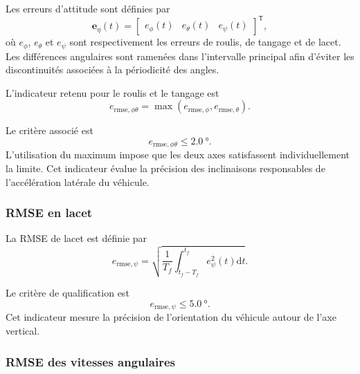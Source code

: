 \documentclass[11pt,a4paper,oneside]{report}
\newcommand{\vect}[1]{\bm{#1}}
\newcommand{\trans}{^{\mathsf T}}
\newcommand{\dd}{\mathrm{d}}
\begin{document}
Les erreurs d'attitude sont définies par
\begin{equation}
	\vect e_\eta(t)
	=
	\begin{bmatrix}
		e_\phi(t) & e_\theta(t) & e_\psi(t)
	\end{bmatrix}\trans,
	\label{eq_attitude_tracking_error}
\end{equation}
où $e_\phi$, $e_\theta$ et $e_\psi$ sont respectivement les erreurs de roulis, de tangage et de lacet. Les différences angulaires sont ramenées dans l'intervalle principal afin d'éviter les discontinuités associées à la périodicité des angles.

L'indicateur retenu pour le roulis et le tangage est
\begin{equation}
	e_{\mathrm{rmse},\phi\theta}
	=
	\max\left(
	e_{\mathrm{rmse},\phi},
	e_{\mathrm{rmse},\theta}
	\right).
	\label{eq_qualification_roll_pitch_rmse}
\end{equation}

Le critère associé est
\begin{equation}
	e_{\mathrm{rmse},\phi\theta}
	\leq
	\SI{2.0}{\degree}.
	\label{eq_roll_pitch_rmse_requirement}
\end{equation}
L'utilisation du maximum impose que les deux axes satisfassent individuellement la limite. Cet indicateur évalue la précision des inclinaisons responsables de l'accélération latérale du véhicule.

\subsubsection{RMSE en lacet}

La RMSE de lacet est définie par
\begin{equation}
	e_{\mathrm{rmse},\psi}
	=
	\sqrt{
		\frac{1}{T_f}
		\int_{t_f-T_f}^{t_f}
		e_\psi^2(t)\dd t
	}.
	\label{eq_qualification_yaw_rmse}
\end{equation}

Le critère de qualification est
\begin{equation}
	e_{\mathrm{rmse},\psi}
	\leq
	\SI{5.0}{\degree}.
	\label{eq_yaw_rmse_requirement}
\end{equation}
Cet indicateur mesure la précision de l'orientation du véhicule autour de l'axe vertical.

\subsubsection{RMSE des vitesses angulaires}
\end{document}
